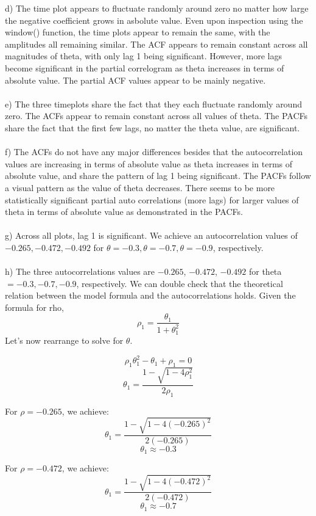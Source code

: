 \documentclass[11pt]{article}
\begin{document}
\newpage
d) The time plot appears to fluctuate randomly around zero no matter how large the negative coefficient grows in asbolute value. Even upon inspection using the window() function, the time plots appear to remain the same, with the amplitudes all remaining similar. The ACF appears to remain constant across all magnitudes of theta, with only lag 1 being significant. However, more lags become significant in the partial correlogram as theta increases in terms of absolute value. The partial ACF values appear to be mainly negative.   
\\\\
e) The three timeplots share the fact that they each fluctuate randomly around zero. The ACFs appear to remain constant across all values of theta. The PACFs share the fact that the first few lags, no matter the theta value, are significant.  
\\\\
f)  The ACFs do not have any major differences besides that the autocorrelation values are increasing in terms of absolute value as theta increases in terms of absolute value, and share the pattern of lag 1 being significant. The PACFs follow a visual pattern as the value of theta decreases. There seems to be more statistically significant partial auto correlations (more lags) for larger values of theta in terms of absolute value as demonstrated in the PACFs. 
\\\\
g) Across all plots, lag 1 is significant. We achieve an autocorrelation values of $-0.265, -0.472, -0.492$ for $\theta = -0.3, \theta = -0.7, \theta = -0.9$, respectively. 
\\\\
h) The three autocorrelations values are ${-0.265}$, ${-0.472}$, ${-0.492}$ for theta $ = -0.3,-0.7,-0.9$, respectively. We can double check that the theoretical relation between the model formula and the autocorrelations holds. Given the formula for rho, $$ \rho_1 =  \frac{\theta_1}{1 + \theta_1^2} $$ Let's now rearrange to solve for $\theta$. 

$$ \rho_1 \theta_1^2 - \theta_1 + \rho_1 = 0 $$
$$ \theta_1 = \frac{1 - \sqrt{1-4\rho_1^2}}{2\rho_1} $$
 
For $\rho = -0.265$, we achieve:
$$ \theta_1 = \frac{1 - \sqrt{1-4(-0.265)^2}}{2(-0.265)} $$
$$ \theta_1 \approx -0.3 $$

For $\rho = -0.472$, we achieve:
$$ \theta_1 = \frac{1 - \sqrt{1-4(-0.472)^2}}{2(-0.472)} $$
$$ \theta_1 \approx -0.7 $$
\end{document}
